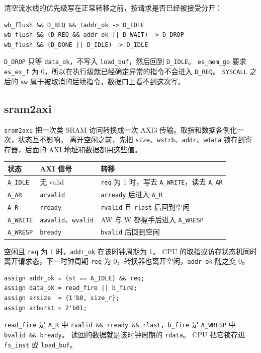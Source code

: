 \documentclass{article}
\begin{document}
清空流水线的优先级写在正常转移之前，按请求是否已经被接受分开：
\begin{verbatim}
wb_flush && D_REQ && !addr_ok -> D_IDLE
wb_flush && (D_REQ && addr_ok || D_WAIT) -> D_DROP
wb_flush && (D_DONE || D_IDLE) -> D_IDLE
\end{verbatim}
\texttt{D\_DROP} 只等 \texttt{data\_ok}，不写入 \texttt{load\_buf}，然后回到 \texttt{D\_IDLE}。
\texttt{es\_mem\_go} 要求 \texttt{es\_ex\_f} 为 0，所以在执行级就已经确定异常的指令不会进入 \texttt{D\_REQ}。
\texttt{SYSCALL} 之后的 \texttt{sw} 属于被取消的后续指令，数据口上看不到这次写。

\subsection{sram2axi}
\texttt{sram2axi} 把一次类 SRAM 访问转换成一次 AXI3 传输。取指和数据各例化一次，状态互不影响。
离开空闲之前，先把 \texttt{size}、\texttt{wstrb}、\texttt{addr}、\texttt{wdata} 锁存到寄存器，后面的 AXI 地址和数据都用这些值。

\begin{center}
\small
\begin{tabular}{@{}llp{}@{}}
\toprule
状态 & AXI 信号 & 转移 \\
\midrule
\texttt{A\_IDLE} & 无 valid & \texttt{req} 为 1 时，写去 \texttt{A\_WRITE}，读去 \texttt{A\_AR} \\
\texttt{A\_AR} & \texttt{arvalid} & \texttt{arready} 后进入 \texttt{A\_R} \\
\texttt{A\_R} & \texttt{rready} & \texttt{rvalid} 且 \texttt{rlast} 后回到空闲 \\
\texttt{A\_WRITE} & \texttt{awvalid}、\texttt{wvalid} & AW 与 W 都握手后进入 \texttt{A\_WRESP} \\
\texttt{A\_WRESP} & \texttt{bready} & \texttt{bvalid} 后回到空闲 \\
\bottomrule
\end{tabular}
\end{center}

空闲且 \texttt{req} 为 1 时，\texttt{addr\_ok} 在该时钟周期为 1。
CPU 的取指或访存状态机同时离开请求态，下一时钟周期 \texttt{req} 为 0，转换器也离开空闲，\texttt{addr\_ok} 随之变 0。
\begin{verbatim}
assign addr_ok = (st == A_IDLE) && req;
assign data_ok = read_fire || b_fire;
assign arsize  = {1'b0, size_r};
assign arburst = 2'b01;
\end{verbatim}
\texttt{read\_fire} 是 \texttt{A\_R} 中 \texttt{rvalid \&\& rready \&\& rlast}，\texttt{b\_fire} 是 \texttt{A\_WRESP} 中 \texttt{bvalid \&\& bready}。
读回的数据就是该时钟周期的 \texttt{rdata}。
CPU 把它锁存进 \texttt{fs\_inst} 或 \texttt{load\_buf}。
\end{document}

